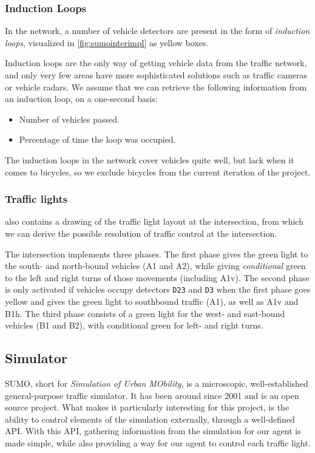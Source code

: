 \subsubsection{Induction Loops}
In the network, a number of vehicle detectors are present in the form of \textit{induction loops}, visualized in \cref{fig:sumointerimpl} as yellow boxes.

Induction loops are the only way of getting vehicle data from the traffic network, and only very few areas have more sophisticated solutions such as traffic cameras or vehicle radars. We assume that we can retrieve the following information from an induction loop, on a one-second basis:
\begin{itemize}
  \item Number of vehicles passed.
  \item Percentage of time the loop was occupied.
\end{itemize}

The induction loops in the network cover vehicles quite well, but lack when it comes to bicycles, so we exclude bicycles from the current iteration of the project.


\subsubsection{Traffic lights}
 also contains a drawing of the traffic light layout at the intersection, from which we can derive the possible resolution of traffic control at the intersection.

The intersection implements three phases.
The first phase gives the green light to the south- and north-bound vehicles (A1 and A2), while giving \emph{conditional} green to the left and right turns of those movements (including A1v).
The second phase is only activated if vehicles occupy detectors \texttt{D23} and \texttt{D3} when the first phase goes yellow and gives the green light to southbound traffic (A1), as well as A1v and B1h. 
The third phase consists of a green light for the west- and east-bound vehicles (B1 and B2), with conditional green for left- and right turns.


\subsection{Simulator}
SUMO, short for \emph{Simulation of Urban MObility}, is a microscopic, well-established general-purpose traffic simulator. It has been around since 2001 and is an open source project. What makes it particularly interesting for this project, is the ability to control elements of the simulation externally, through a well-defined API. With this API, gathering information from the simulation for our agent is made simple, while also providing a way for our agent to control each traffic light.

